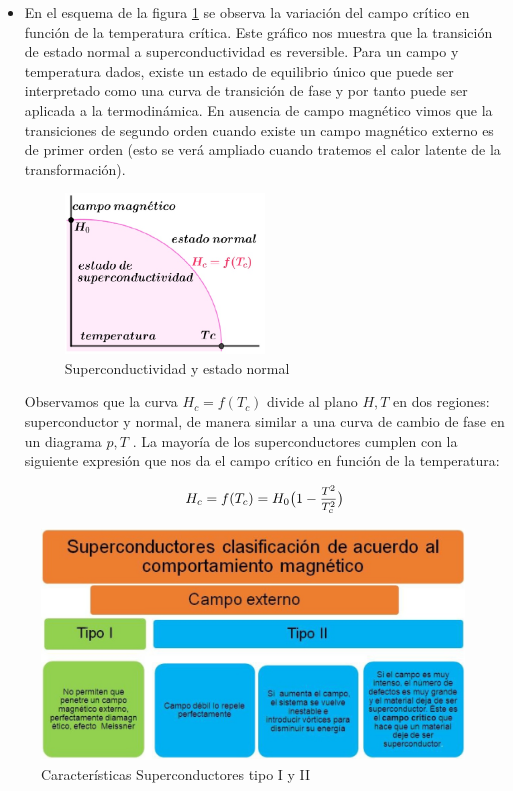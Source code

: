 \begin{itemize}
	\item En el esquema de la figura \ref{fig:411} se observa la variación del campo crítico en función de la temperatura crítica. Este gráfico nos muestra que la transición de estado normal a superconductividad es reversible. Para un campo y temperatura dados, existe un estado de equilibrio único que puede ser interpretado como una curva de transición de fase y por tanto puede ser aplicada a la termodinámica. En ausencia de campo magnético vimos que la transiciones de segundo orden cuando existe un campo magnético externo es de primer orden (esto se verá ampliado cuando tratemos el calor latente de la transformación).	
	
\begin{figure}[H]
    \centering
    \includegraphics[width=0.5\textwidth]{./Figures/fig411}
	\caption{Superconductividad y estado normal}
	\label{fig:411}
\end{figure}

Observamos que la curva  $H_{c}=f(T_{c})$ divide al plano $H,T$ en dos regiones: superconductor y normal, de manera similar a una curva de cambio de fase en un diagrama $p,T$ . La mayoría de los superconductores cumplen con la siguiente expresión que nos da el campo crítico en función de la temperatura:	
	
\begin{equation}
	 H_{c}=f(T_{c}) = H_{0}\big( 1- \mfrac{T^{2}}{T_{c}^{2}}    \big)
\end{equation}
	
\end{itemize}


\begin{figure}[H]
    \centering
    \includegraphics[width=1.0\textwidth]{./Figures/fig412}
    \caption{Características Superconductores tipo I y II}
	\label{fig:412}
\end{figure}


